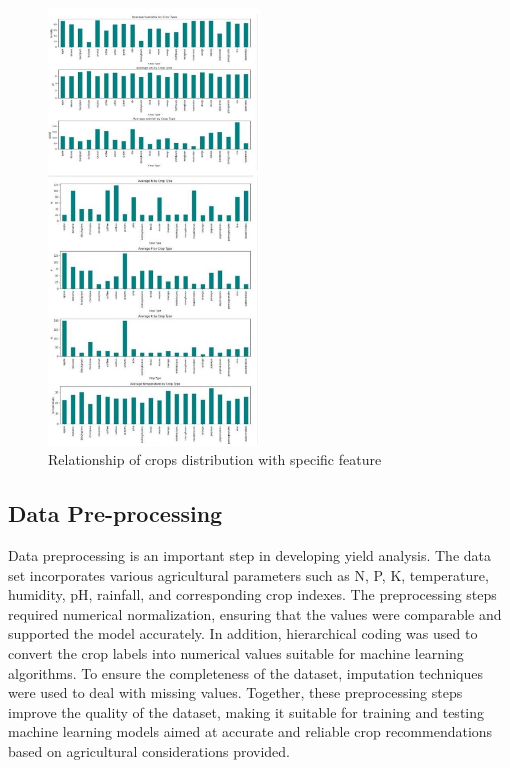 \begin{figure}[h]
    \centering
    \includegraphics[width=0.5\textwidth]{visual 3.png}
    \caption{Relationship of crops distribution with specific feature
}
    \label{fig:my_label}
    
\end{figure}

\subsection {Data Pre-processing}



Data preprocessing is an important step in developing yield analysis. The data set incorporates various agricultural parameters such as N, P, K, temperature, humidity, pH, rainfall, and corresponding crop indexes. The preprocessing steps required numerical normalization, ensuring that the values were comparable and supported the model accurately. In addition, hierarchical coding was used to convert the crop labels into numerical values suitable for machine learning algorithms. To ensure the completeness of the dataset, imputation techniques were used to deal with missing values. Together, these preprocessing steps improve the quality of the dataset, making it suitable for training and testing machine learning models aimed at accurate and reliable crop recommendations based on agricultural considerations provided.


